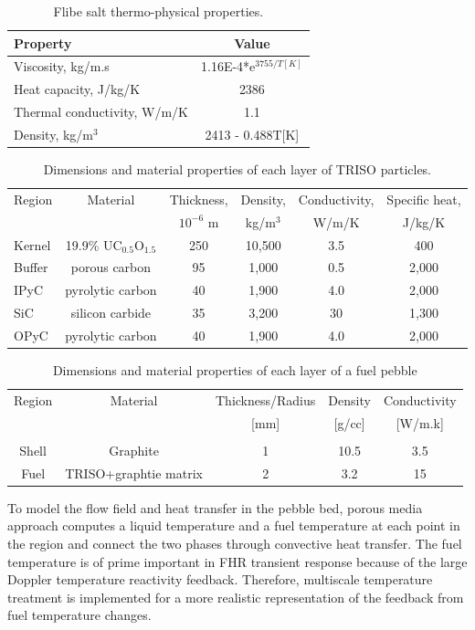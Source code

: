 \documentclass{elsarticle}
\begin{document}
\begin{table}
  \caption{Flibe salt thermo-physical properties.}
  \centering
  \begin{tabular}{lc}
    \hline
    Property & Value\\
    \hline
    Viscosity, kg/m.s & 1.16E-4*e$^{3755/T[K]}$\\
    Heat capacity, J/kg/K & 2386\\
    Thermal conductivity, W/m/K & 1.1\\
    Density, kg/m$^3$ & 2413 - 0.488T[K]\\
    \hline
  \end{tabular}
\label{tab:flibe}
\end{table}

\begin{table}
  \caption{Dimensions and material properties of each layer of TRISO particles.}
  \begin{tabular}[h]{lccccc}
    \hline
    Region&Material&Thickness,&Density,&Conductivity,&Specific heat,\\
    &&$10^{-6}$ m&kg/m$^3$&W/m/K&J/kg/K\\
    \hline
    Kernel&19.9\% UC$_{0.5}$O$_{1.5}$&250&10,500&3.5&400\\
    Buffer&porous carbon&95&1,000&0.5&2,000\\
    IPyC&pyrolytic carbon&40&1,900&4.0&2,000\\
    SiC&silicon carbide&35&3,200&30&1,300\\
    OPyC&pyrolytic carbon&40&1,900&4.0&2,000\\
    \hline
  \end{tabular}
  \label{tab:TRISO_prop}
\end{table}


\begin{table}
  \begin{tabular}[h]{ccccc}
    Region&Material&Thickness/Radius&Density&Conductivity\\
    &&[mm]&[g/cc]&[W/m.k] \\
    \hline\\
    Shell&Graphite&1&10.5&3.5\\
    Fuel&TRISO+graphtie matrix&2&3.2&15\\
  \end{tabular}
  \caption{Dimensions and material properties of each layer of a fuel pebble}
  \label{tab:pb_prop}
\end{table}


To model the flow field and heat transfer in the pebble bed, porous media approach computes a liquid temperature and a fuel temperature at each point in the region and connect the two phases through convective heat transfer. The fuel temperature is of prime important in FHR transient response because of the large Doppler temperature reactivity feedback. Therefore, multiscale temperature treatment is implemented for a more realistic representation of the feedback from fuel temperature changes. 
\end{document}
